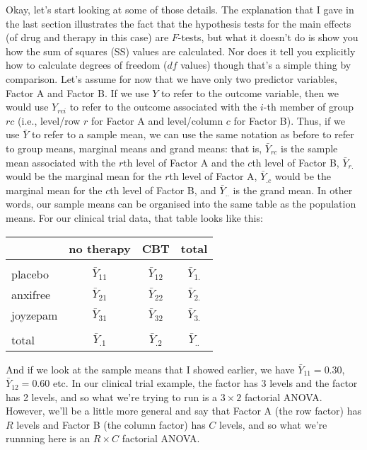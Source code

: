 Okay, let's start looking at some of those details. The explanation that I gave in the last section illustrates the fact that the hypothesis tests for the main effects (of drug and therapy in this case) are $F$-tests, but what it doesn't do is show you how the sum of squares (SS) values are calculated. Nor does it tell you explicitly how to calculate degrees of freedom ($df$ values) though that's a simple thing by comparison. Let's assume for now that we have only two predictor variables, Factor A and Factor B. If we use $Y$ to refer to the outcome variable, then we would use $Y_{rci}$ to refer to the outcome associated with the $i$-th member of group $rc$ (i.e., level/row $r$ for Factor A and level/column $c$ for Factor B). Thus, if we use $\bar{Y}$ to refer to a sample mean, we can use the same notation as before to refer to group means, marginal means and grand means: that is, $\bar{Y}_{rc}$ is the sample mean associated with the $r$th level of Factor A and the $c$th level of Factor B, $\bar{Y}_{r.} $would be the marginal mean for the $r$th level of Factor A, $\bar{Y}_{.c}$ would be the marginal mean for the $c$th level of Factor B, and $\bar{Y}_{..}$ is the grand mean. In other words, our sample means can be organised into the same table as the population means. For our clinical trial data, that table looks like this:
\begin{center}
\begin{tabular}{l|cc|c} 
& no therapy & CBT & total \\[1ex] \hline &&&\\[-6pt]
placebo & $\bar{Y}_{11}$ & $\bar{Y}_{12}$ & $\bar{Y}_{1.}$  \\[1ex]
anxifree & $\bar{Y}_{21}$ & $\bar{Y}_{22}$ & $\bar{Y}_{2.}$  \\[1ex]
joyzepam & $\bar{Y}_{31}$ &$\bar{Y}_{32}$ & $\bar{Y}_{3.}$ \\[1ex] \hline  &&&\\[-6pt]
total & $\bar{Y}_{.1}$ & $\bar{Y}_{.2}$  &  $\bar{Y}_{..}$
\end{tabular}
\end{center}
And if we look at the sample means that I showed earlier, we have $\bar{Y}_{11} = 0.30$, $\bar{Y}_{12} = 0.60$ etc. In our clinical trial example, the  factor has 3 levels and the  factor has 2 levels, and so what we're trying to run is a $3 \times 2$ factorial ANOVA. However, we'll be a little more general and say that Factor A (the row factor) has $R$ levels and Factor B (the column factor) has $C$ levels, and so what we're runnning here is an $R \times C$ factorial ANOVA.


